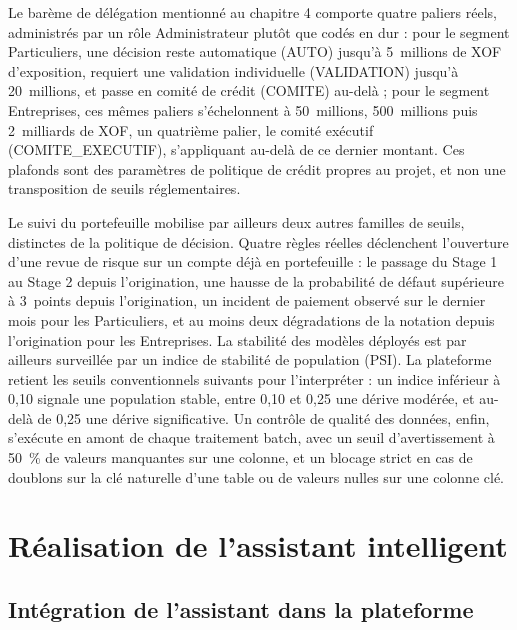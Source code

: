 Le barème de délégation mentionné au chapitre 4 comporte quatre paliers réels, administrés par un rôle Administrateur plutôt que codés en dur : pour le segment Particuliers, une décision reste automatique (AUTO) jusqu'à 5~millions de XOF d'exposition, requiert une validation individuelle (VALIDATION) jusqu'à 20~millions, et passe en comité de crédit (COMITE) au-delà ; pour le segment Entreprises, ces mêmes paliers s'échelonnent à 50~millions, 500~millions puis 2~milliards de XOF, un quatrième palier, le comité exécutif (COMITE\_EXECUTIF), s'appliquant au-delà de ce dernier montant. Ces plafonds sont des paramètres de politique de crédit propres au projet, et non une transposition de seuils réglementaires.

Le suivi du portefeuille mobilise par ailleurs deux autres familles de seuils, distinctes de la politique de décision. Quatre règles réelles déclenchent l'ouverture d'une revue de risque sur un compte déjà en portefeuille : le passage du Stage 1 au Stage 2 depuis l'origination, une hausse de la probabilité de défaut supérieure à 3~points depuis l'origination, un incident de paiement observé sur le dernier mois pour les Particuliers, et au moins deux dégradations de la notation depuis l'origination pour les Entreprises. La stabilité des modèles déployés est par ailleurs surveillée par un indice de stabilité de population (PSI). La plateforme retient les seuils conventionnels suivants pour l'interpréter : un indice inférieur à 0,10 signale une population stable, entre 0,10 et 0,25 une dérive modérée, et au-delà de 0,25 une dérive significative. Un contrôle de qualité des données, enfin, s'exécute en amont de chaque traitement batch, avec un seuil d'avertissement à 50~\% de valeurs manquantes sur une colonne, et un blocage strict en cas de doublons sur la clé naturelle d'une table ou de valeurs nulles sur une colonne clé.

\section{Réalisation de l'assistant intelligent}

\subsection{Intégration de l'assistant dans la plateforme}

